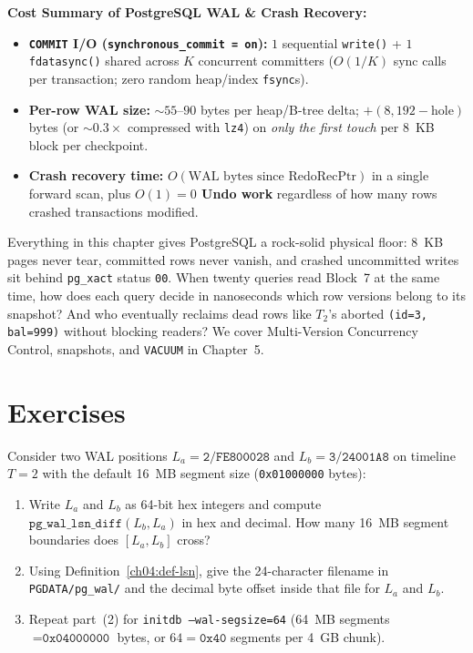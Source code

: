 \begin{complexitybox}
\textbf{Cost Summary of PostgreSQL WAL \& Crash Recovery:}
\begin{itemize}
  \item \textbf{\texttt{COMMIT} I/O (\texttt{synchronous\_commit = on}):} $1$ sequential \texttt{write()} + $1$ \texttt{fdatasync()} shared across $K$ concurrent committers ($O(1/K)$ sync calls per transaction; zero random heap/index \texttt{fsync}s).
  \item \textbf{Per-row WAL size:} $\sim 55$--$90$ bytes per heap/B-tree delta; $+ (8{,}192 - \text{hole})$ bytes (or $\sim 0.3\times$ compressed with \texttt{lz4}) on \emph{only the first touch} per 8~KB block per checkpoint.
  \item \textbf{Crash recovery time:} $O(\text{WAL bytes since } \mathrm{RedoRecPtr})$ in a single forward scan, plus \textbf{$O(1) = 0$ Undo work} regardless of how many rows crashed transactions modified.
\end{itemize}
\end{complexitybox}

Everything in this chapter gives PostgreSQL a rock-solid physical floor: 8~KB pages never tear, committed rows never vanish, and crashed uncommitted writes sit behind \texttt{pg\_xact} status \texttt{00}. When twenty queries read Block~7 at the same time, how does each query decide in nanoseconds which row versions belong to its snapshot? And who eventually reclaims dead rows like $T_2$'s aborted \texttt{(id=3, bal=999)} without blocking readers? We cover Multi-Version Concurrency Control, snapshots, and \texttt{VACUUM} in Chapter~5.

\section{Exercises}
\label{ch04:exercises}

\begin{exercise}
\label{ch04:ex-lsn-segments}
Consider two WAL positions $L_a = \texttt{2/FE800028}$ and $L_b = \texttt{3/24001A8}$ on timeline $T = 2$ with the default 16~MB segment size (\texttt{0x01000000} bytes):
\begin{enumerate}
  \item Write $L_a$ and $L_b$ as 64-bit hex integers and compute $\texttt{pg\_wal\_lsn\_diff}(L_b, L_a)$ in hex and decimal. How many 16~MB segment boundaries does $[L_a, L_b]$ cross?
  \item Using Definition~\ref{ch04:def-lsn}, give the 24-character filename in \texttt{PGDATA/pg\_wal/} and the decimal byte offset inside that file for $L_a$ and $L_b$.
  \item Repeat part~(2) for \texttt{initdb --wal-segsize=64} (64~MB segments $= \texttt{0x04000000}$ bytes, or $64 = \texttt{0x40}$ segments per 4~GB chunk).
\end{enumerate}
\end{exercise}

